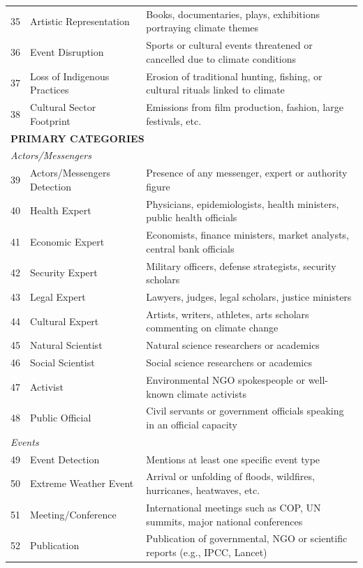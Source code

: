 {\begin{longtable}{p{0.5cm}p{5cm}p{16cm}}
35 & Artistic Representation & Books, documentaries, plays, exhibitions portraying climate themes \\
36 & Event Disruption & Sports or cultural events threatened or cancelled due to climate conditions \\
37 & Loss of Indigenous Practices & Erosion of traditional hunting, fishing, or cultural rituals linked to climate \\
38 & Cultural Sector Footprint & Emissions from film production, fashion, large festivals, etc. \\
\midrule
\multicolumn{3}{l}{\cellcolor{gray!10}\textbf{PRIMARY CATEGORIES}} \\
\midrule
\multicolumn{3}{l}{\textit{Actors/Messengers}} \\
39 & Actors/Messengers Detection & Presence of any messenger, expert or authority figure \\
40 & Health Expert & Physicians, epidemiologists, health ministers, public health officials \\
41 & Economic Expert & Economists, finance ministers, market analysts, central bank officials \\
42 & Security Expert & Military officers, defense strategists, security scholars \\
43 & Legal Expert & Lawyers, judges, legal scholars, justice ministers \\
44 & Cultural Expert & Artists, writers, athletes, arts scholars commenting on climate change \\
45 & Natural Scientist & Natural science researchers or academics \\
46 & Social Scientist & Social science researchers or academics \\
47 & Activist & Environmental NGO spokespeople or well-known climate activists \\
48 & Public Official & Civil servants or government officials speaking in an official capacity \\
\midrule
\multicolumn{3}{l}{\textit{Events}} \\
49 & Event Detection & Mentions at least one specific event type \\
50 & Extreme Weather Event & Arrival or unfolding of floods, wildfires, hurricanes, heatwaves, etc. \\
51 & Meeting/Conference & International meetings such as COP, UN summits, major national conferences \\
52 & Publication & Publication of governmental, NGO or scientific reports (e.g., IPCC, Lancet) \\

\end{longtable}}
